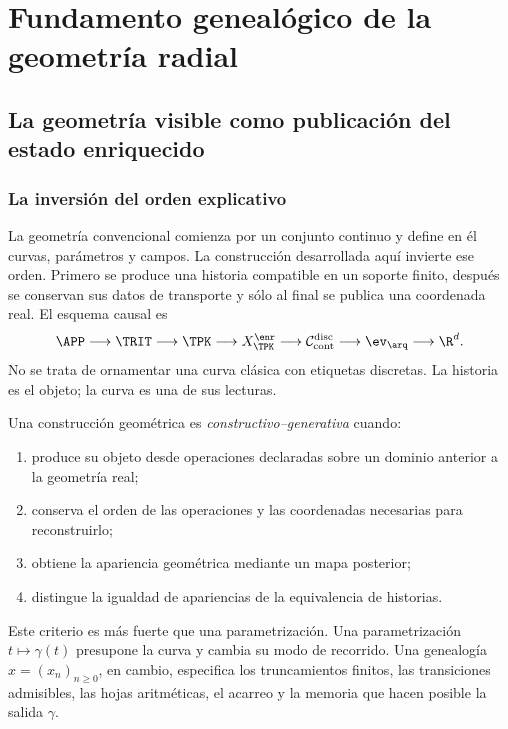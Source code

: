 \part{Fundamento genealógico de la geometría radial}

\chapter{La geometría visible como publicación del estado enriquecido}

\section{La inversión del orden explicativo}

La geometría convencional comienza por un conjunto continuo y define en él
curvas, parámetros y campos. La construcción desarrollada aquí invierte ese
orden. Primero se produce una historia compatible en un soporte finito,
después se conservan sus datos de transporte y sólo al final se publica una
coordenada real. El esquema causal es
\begin{equation}
 \APP\longrightarrow\TRIT\longrightarrow\TPK
 \longrightarrow X_{\TPK}^{\enr}
 \longrightarrow\mathcal C_{\mathrm{cont}}^{\mathrm{disc}}
 \longrightarrow\ev_{\arq}
 \longrightarrow\R^d.
 \label{espiral:eq:cadena-genealogica-espiral}
\end{equation}
No se trata de ornamentar una curva clásica con etiquetas discretas. La
historia es el objeto; la curva es una de sus lecturas.

\begin{definition}
Una construcción geométrica es \emph{constructivo--generativa} cuando:
\begin{enumerate}
\item produce su objeto desde operaciones declaradas sobre un dominio
anterior a la geometría real;
\item conserva el orden de las operaciones y las coordenadas necesarias para
reconstruirlo;
\item obtiene la apariencia geométrica mediante un mapa posterior;
\item distingue la igualdad de apariencias de la equivalencia de historias.
\end{enumerate}
\end{definition}

Este criterio es más fuerte que una parametrización. Una parametrización
\(t\mapsto\gamma(t)\) presupone la curva y cambia su modo de recorrido. Una
genealogía \(x=(x_n)_{n\ge0}\), en cambio, especifica los truncamientos
finitos, las transiciones admisibles, las hojas aritméticas, el acarreo y la
memoria que hacen posible la salida \(\gamma\).

